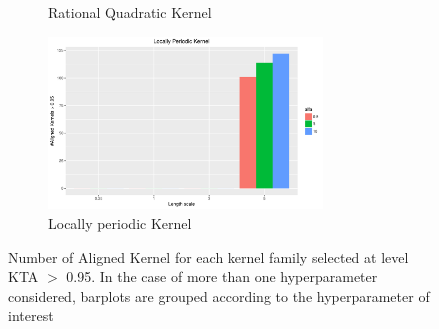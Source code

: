 \documentclass[11pt, a4paper]{article} %
\begin{document}
\begin{landscape}
\begin{figure}
\begin{subfigure}[b]{0.475\hsize}
            \caption[]%
            {{\small Rational Quadratic Kernel}}
        \end{subfigure}
        \quad
        \begin{subfigure}[b]{0.475\hsize}\centering   
            \centering 
            \includegraphics[width=0.8\textwidth]{Ex1_KlocPR.pdf}
            \caption[]%
            {{\small Locally periodic Kernel}}
        \end{subfigure}
        \caption[ Number of Kernel Aligned for each kernel family selected at level KTA $>$ 0.95. In the case of more than one hyperparameter considered, barplot are grouped according to the hyperparameter of interest ]
        {\small Number of Aligned Kernel for each kernel family selected at level KTA $>$ 0.95. In the case of more than one hyperparameter considered, barplots are grouped according to the hyperparameter of interest} 
        \end{figure}
\end{landscape}

\restoregeometry 
\end{document}

